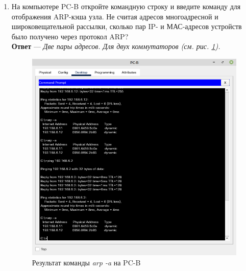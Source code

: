 \documentclass[a4paper,14pt]{extarticle}
\begin{document}
\begin{enumerate}
	\item На компьютере PC-B откройте командную строку и введите команду для отображения ARP-кэша
	узла. Не считая адресов многоадресной и широковещательной рассылки, сколько пар IP- и МАС-адресов устройств было получено через протокол ARP?\\
	\textbf{Ответ} --- \textit{Две пары адресов. Для двух коммутаторов (см. рис. \ref{fig:arp-pc-b}).}
	\begin{figure}[h!]
		\centering
		\includegraphics[width=0.5\linewidth]{images/arp-pc-b}
		\caption{Результат команды \textit{arp -a} на PC-B}
		\label{fig:arp-pc-b}
	\end{figure}
	

\end{enumerate}
\end{document}
